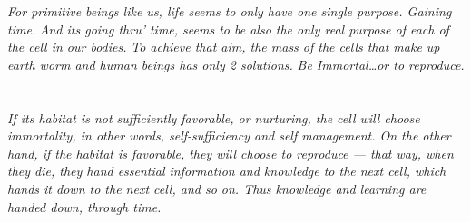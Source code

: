 \textit{For primitive beings like us, life seems to only have one single purpose. Gaining time.}
\textit{And its going thru’ time, seems to be also the only real purpose of each of the cell in our bodies.}
\textit{To achieve that aim, the mass of the cells that make up earth worm and human beings has only 2 solutions.}
\textit{Be Immortal…or to reproduce.}
\section{}
\textit{If its habitat is not sufficiently favorable, or nurturing, the cell will choose immortality, in other words, self-sufficiency and self management. On the other hand, if the habitat is favorable, they will choose to reproduce — that way, when they die, they hand essential information and knowledge to the next cell, which hands it down to the next cell, and so on. Thus knowledge and learning are handed down, through time.}